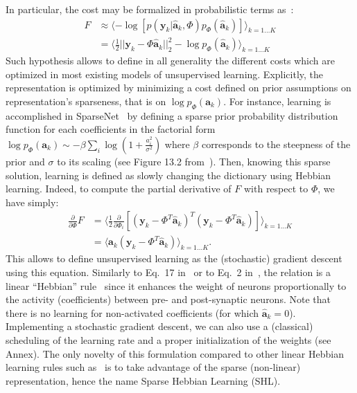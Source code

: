 \documentclass[vision,article,submit,oneauthor,pdftex]{Definitions/mdpi}
\newcommand{\coef}{\mathbf{a}} %
\newcommand{\image}{\mathbf{y}} %
\newcommand{\dico}{\Phi} %
\newcommand{\norm}[1]{|\!| #1 |\!|}
\begin{document}
{%
In particular, the cost %
may be formalized in probabilistic terms as~\citep{Olshausen97}:
\begin{align}
F &\approx \langle - \log [ p(\image_k | \hat{\coef}_{k}, \dico ) p_\dico(\hat{\coef}_{k}) ]\rangle_{k = 1 \ldots K} \\
&= \langle \frac{1}{2} \norm{\image_k - \dico \hat{\coef}_{k}}_2^2 - \log p_\dico(\hat{\coef}_{k})\rangle_{k = 1 \ldots K} \label{eq:sparse_cost} \end{align}
Such hypothesis allows to define in all generality the different costs which are optimized in most existing models of unsupervised learning. Explicitly, the representation is optimized by minimizing a cost defined on prior assumptions on representation's sparseness, that is on $\log p_\dico( \coef_{k})$. For instance, learning is accomplished in {\sc SparseNet}~\citep{Olshausen97} by defining a sparse prior probability distribution function for each coefficients in the factorial form $\log p_\dico(\coef_{k}) \sim -\beta \sum_i \log ( 1 + \frac{a_i^2}{\sigma^2} )$ where $\beta$ corresponds to the steepness of the prior and $\sigma$ to its scaling (see Figure 13.2 from~\citep{Olshausen02}). Then, knowing this sparse solution, learning is defined as slowly changing the dictionary using Hebbian learning.
Indeed, to compute the partial derivative of $F$ with respect to $\dico$, we have simply:
\begin{align}
\frac{\partial }{\partial \dico } F &= \langle\frac{1}{2} \frac{\partial }{\partial \dico_i }[(\image_k - \dico^T \hat{\coef}_{k})^T (\image_k - \dico^T \hat{\coef}_{k})]\rangle_{k = 1 \ldots K} \\
&= \langle\hat{\coef}_{k} (\image_k - \dico^T \hat{\coef}_{k})\rangle_{k = 1 \ldots K}.
\end{align}
This allows to define unsupervised learning as the (stochastic) gradient descent using this equation. Similarly to Eq.~17 in~\citep{Olshausen97} or to Eq.~2 in~\citep{Smith06}, the relation is a linear ``Hebbian'' rule~\citep{Hebb49} since it enhances the weight of neurons proportionally to the activity (coefficients) between pre- and post-synaptic neurons. Note that there is no learning for non-activated coefficients (for which $\hat{\coef}_{k}=0$). Implementing a stochastic gradient descent, we can also use a (classical) scheduling of the learning rate and a proper initialization of the weights (see Annex). The only novelty of this formulation compared to other linear Hebbian learning rules such as~\citep{Oja82} is to take advantage of the sparse (non-linear) representation, hence the name Sparse Hebbian Learning (SHL).
}
\end{document}
